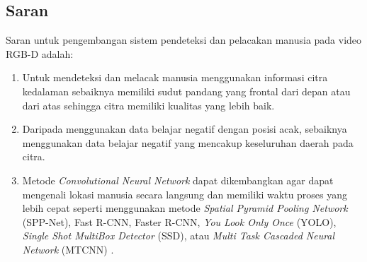 \subsection{Saran}
\noindent Saran untuk pengembangan sistem pendeteksi dan pelacakan manusia pada video RGB-D adalah:
\begin{enumerate}
\item Untuk mendeteksi dan melacak manusia menggunakan informasi citra kedalaman sebaiknya memiliki sudut pandang yang frontal dari depan atau dari atas sehingga citra memiliki kualitas yang lebih baik.
\item Daripada menggunakan data belajar negatif dengan posisi acak, sebaiknya menggunakan data belajar negatif yang mencakup keseluruhan daerah pada citra.
\item Metode \textit{Convolutional Neural Network} dapat dikembangkan agar dapat mengenali lokasi manusia secara langsung dan memiliki waktu proses yang lebih cepat seperti menggunakan metode \textit{Spatial Pyramid Pooling Network} (SPP-Net), Fast R-CNN, Faster R-CNN, \textit{You Look Only Once} (YOLO), \textit{Single Shot MultiBox Detector} (SSD), atau \textit{Multi Task Cascaded Neural Network} (MTCNN) \cite{20}.
\end{enumerate}

\newpage